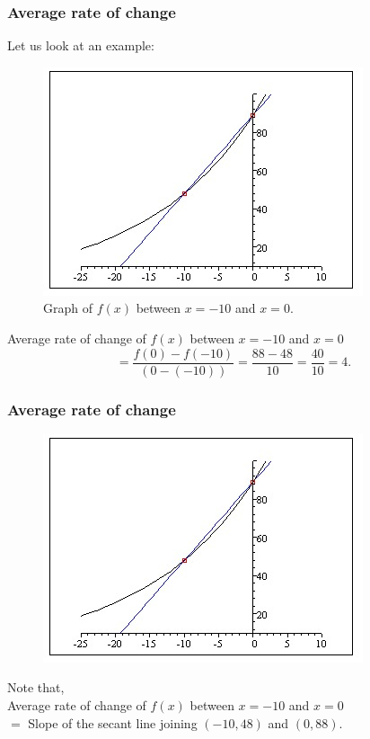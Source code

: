 \documentclass[t]{beamer}
\theoremstyle{plain}
\theoremstyle{definition}
\newcommand{\nin}{\noindent}
\begin{document}
\frame
{
\frametitle{Average rate of change}
Let us look at an example:
\begin{figure}[t]
\begin{center}
\includegraphics[scale=0.4]{image011.jpg}
\caption{Graph of $f(x)$ between $x=-10$ and $x=0$.}
\label{fig:3}
\end{center}
\end{figure}\pause

\nin Average rate of change of $f(x)$ between $x=-10$ and $x=0$\pause
\[ =\frac{f(0)-f(-10)}{(0-(-10))}
=\frac{88-48}{10}=\frac{40}{10}=4. \]
}

\frame
{
\frametitle{Average rate of change}
\begin{figure}[t]
\begin{center}
\includegraphics[scale=0.4]{image011.jpg}
\end{center}
\end{figure}

Note that, \\ Average rate of change of $f(x)$ between $x=-10$ and $x=0$ \\ \pause
 $=$ Slope of the secant line joining $(-10, 48)$ and $(0,88)$.
 
}
\end{document}
